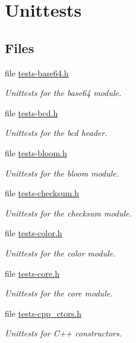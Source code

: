 \hypertarget{group__unittests}{}\section{Unittests}
\label{group__unittests}
\subsection*{Files}
\begin{DoxyCompactItemize}
\item 
file \hyperlink{tests-base64_8h}{tests-\/base64.\+h}
\begin{DoxyCompactList}\small\item\em Unittests for the {\ttfamily base64} module. \end{DoxyCompactList}\item 
file \hyperlink{tests-bcd_8h}{tests-\/bcd.\+h}
\begin{DoxyCompactList}\small\item\em Unittests for the {\ttfamily bcd} header. \end{DoxyCompactList}\item 
file \hyperlink{tests-bloom_8h}{tests-\/bloom.\+h}
\begin{DoxyCompactList}\small\item\em Unittests for the {\ttfamily bloom} module. \end{DoxyCompactList}\item 
file \hyperlink{tests-checksum_8h}{tests-\/checksum.\+h}
\begin{DoxyCompactList}\small\item\em Unittests for the {\ttfamily checksum} module. \end{DoxyCompactList}\item 
file \hyperlink{tests-color_8h}{tests-\/color.\+h}
\begin{DoxyCompactList}\small\item\em Unittests for the {\ttfamily color} module. \end{DoxyCompactList}\item 
file \hyperlink{tests-core_8h}{tests-\/core.\+h}
\begin{DoxyCompactList}\small\item\em Unittests for the {\ttfamily core} module. \end{DoxyCompactList}\item 
file \hyperlink{tests-cpp__ctors_8h}{tests-\/cpp\+\_\+ctors.\+h}
\begin{DoxyCompactList}\small\item\em Unittests for C++ constructors. \end{DoxyCompactList}\item 

\end{DoxyCompactItemize}
